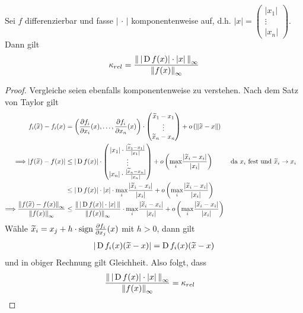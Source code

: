 \begin{Leme}
  \label{3.2.17}
  Sei $f$ differenzierbar und fasse $|\,\cdot\,|$ komponentenweise auf,
  d.h. $|x| = \begin{pmatrix}
    |x_1| \\
    \vdots \\
    |x_n|
  \end{pmatrix}$.
  Dann gilt
  \begin{gather}
    \kappa_{rel} = \frac{\nn[\,|\D f(x)|\cdot|x|\,]_\infty}{\nn[f(x)]_\infty}
    \label{III.2.16}
  \end{gather}
\end{Leme}

\begin{proof}
  Vergleiche seien ebenfalls komponentenweise zu verstehen.
  Nach dem Satz von Taylor gilt
 \begin{align*}
    f_i(\widetilde{x})-f_i(x) 
     &= \left( 
       \frac{\partial f_i}{\partial x_i}(x),
       \dotsc ,\frac{\partial f_i}{\partial x_n}(x) 
       \right)
       \cdot \begin{pmatrix}
         \widetilde{x}_1-x_1 \\
         \vdots \\
         \widetilde{x}_n-x_n
       \end{pmatrix}
     + o\left(\nn[\widetilde{x}-x]\right) \\
   \Longrightarrow 
   |f(\widetilde{x})-f(x)|
     &\leq |\D f(x)|
       \cdot \begin{pmatrix}
       |x_1|\cdot \frac{|\widetilde{x}_1-x_1|}{|x_1|}\\
       \vdots \\
       |x_n|\cdot \frac{|\widetilde{x}_n-x_n|}{|x_n|}
       \end{pmatrix}
   + o\left(
   \underset{i}{\max} \frac{|\widetilde{x}_i-x_i|}{|x_i|}
   \right)
     && \text{da $x_i$ fest und $\widetilde{x}_i\to x_i$} \\
     &\leq |\D f(x)| \cdot |x| 
       \cdot \underset{i}{\max} \frac{|\widetilde{x}_i-x_i|}{|x_i|}
       + o\left(
       \underset{i}{\max} \frac{|\widetilde{x}_i-x_i|}{|x_i|}
       \right) \\
   \Longrightarrow \frac{\nn[f(\widetilde{x})-f(x)]_\infty}{\nn[f(x)]_\infty}
     &\leq  \frac{\nn[\,|\D f(x)|\cdot |x| \,]}{\nn[f(x)]_\infty}
       \cdot \underset{i}{\max}\frac{|\widetilde{x}_i-x_i|}{|x_i|}
       + o\left( 
       \underset{i}{\max} \frac{|\widetilde{x}_i-x_i|}{|x_i|} 
       \right)
 \end{align*}
  Wähle $\widetilde{x}_i = x_j+h\cdot \Sign \frac{\partial f_i}{\partial x_j}(x)$ mit $h>0$,
  dann gilt
  \begin{gather*}
    |\D f_i(x)(\widetilde{x}-x)| = \D f_i(x)(\widetilde{x}-x)
  \end{gather*}
  und in obiger Rechnung gilt Gleichheit.
  Also folgt, dass
  \begin{align*}
    \frac{\nn[\,|\D f(x)|\cdot |x| \, ]_\infty}{\nn[f(x)]_\infty} &= \kappa_{rel} 
  \end{align*}
\end{proof}

